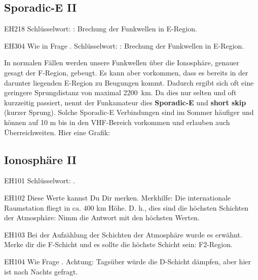 \subsection{Sporadic-E II}
\begin{sol}{EH218}
 Schlüsselwort: : Brechung der Funkwellen in E-Region. 
\end{sol}

\begin{sol}{EH304}
 Wie in Frage . Schlüsselwort: : Brechung der Funkwellen in E-Region. 
\end{sol}


\begin{ohmchapter}
    In normalen Fällen werden unsere Funkwellen über die Ionosphäre, genauer gesagt der F-Region, gebeugt. Es kann aber vorkommen, dass es bereits in der darunter liegenden E-Region zu Beugungen kommt. Dadurch ergibt sich oft eine geringere Sprungdistanz von maximal \SI{2200} {\kilo\meter}. Da dies nur selten und oft kurzzeitig passiert, nennt der Funkamateur dies \textbf{Sporadic-E} und \textbf{short skip} (kurzer Sprung). Solche Sporadic-E Verbindungen sind im Sommer häufiger und können auf 10 m bis in den VHF-Bereich vorkommen und erlauben auch Überreichweiten. Hier eine Grafik:
\end{ohmchapter}  


\subsection{Ionosphäre II}

\begin{sol}{EH101}
Schlüsselwort: .
\end{sol}

\begin{sol}{EH102}
Diese Werte kannst Du Dir merken. Merkhilfe: Die internationale Raumstation fliegt in ca. 400 km Höhe. D. h., dies sind die höchsten Schichten der Atmosphäre: Nimm die Antwort mit den höchsten Werten.
\end{sol}

\begin{sol}{EH103}
Bei der Aufzählung der Schichten der Atmosphäre wurde es erwähnt. Merke dir die F-Schicht und es sollte die höchste Schicht sein: F2-Region.
\end{sol}

\begin{sol}{EH104}
Wie Frage . Achtung: Tagsüber würde die D-Schicht dämpfen, aber hier ist nach Nachts gefragt.
\end{sol}

